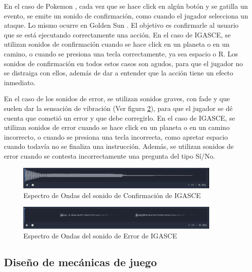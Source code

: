 En el caso de Pokemon \cite{PokemonEmerald}, cada vez que se hace click en algún botón y se gatilla un evento, se emite un sonido de confirmación, como cuando el jugador selecciona un ataque. Lo mismo ocurre en Golden Sun \cite{Wiki_Golden_Sun}. El objetivo es confirmarle al usuario que se está ejecutando correctamente una acción. En el caso de IGASCE, se utilizan sonidos de confirmación cuando se hace click en un planeta o en un camino, o cuando se presiona una tecla correctamente, ya sea espacio o R. Los sonidos de confirmación en todos estos casos son agudos, para que el jugador no se distraiga con ellos, además de dar a entender que la acción tiene un efecto inmediato.

En el caso de los sonidos de error, se utilizan sonidos graves, con fade y que suelen dar la sensación de vibración (Ver figura \ref{EspectroOndasSonidoError}), para que el jugador se dé cuenta que cometió un error y que debe corregirlo. En el caso de IGASCE, se utilizan sonidos de error cuando se hace click en un planeta o en un camino incorrecto, o cuando se presiona una tecla incorrecta, como apretar espacio cuando todavía no se finaliza una instrucción. Además, se utilizan sonidos de error cuando se contesta incorrectamente una pregunta del tipo Sí/No.

\begin{figure}[h]
	\centering
	\includegraphics[width=0.9\textwidth]{imagenes/EspectroOndasConfirmacion.png}
	\caption{Espectro de Ondas del sonido de Confirmación de IGASCE}
	\label{EspectroOndasSonidoConfirmacion}
\end{figure}


\begin{figure}[h]
	\centering
	\includegraphics[width=0.9\textwidth]{imagenes/EspectroOndasError.png}
	\caption{Espectro de Ondas del sonido de Error de IGASCE}
	\label{EspectroOndasSonidoError}
\end{figure}


\subsection{Diseño de mecánicas de juego}

